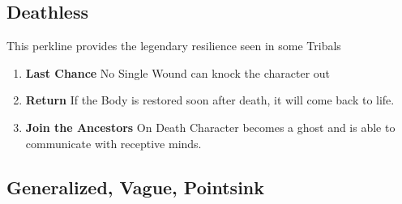 \subsection{Deathless}\label{subsec:deathless}
This perkline provides the legendary resilience seen in some Tribals
\begin{enumerate}
    \item \textbf{Last Chance} No Single Wound can knock the character out
    \item \textbf{Return} If the Body is restored soon after death, it will come back to life.
    \item \textbf{Join the Ancestors} On Death Character becomes a ghost and is able to communicate with receptive minds.
\end{enumerate}


\subsection{Generalized, Vague, Pointsink}\label{subsec:GVPS}
